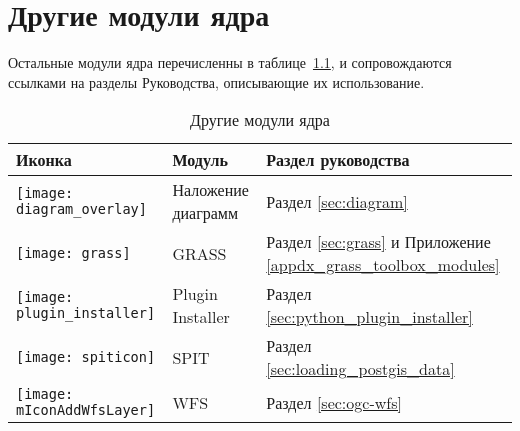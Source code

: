 
\chapter{Другие модули ядра}


Остальные модули ядра перечисленны в таблице~\ref{tab:other_core}, и
сопровождаются ссылками на разделы Руководства, описывающие их использование.

\begin{table}[H]
\centering
 \begin{tabular}{|l|l|p{8cm}|}
\hline \textbf{Иконка} & \textbf{Модуль} & \textbf{Раздел руководства}\\
\hline
\texttt{[image: diagram\_overlay]}
 & Наложение диаграмм \index{модули!диаграмма}& Раздел \ref{sec:diagram}\\
\hline
\texttt{[image: grass]}
 & GRASS \index{модули!инструменты GRASS} & Раздел \ref{sec:grass} и Приложение \ref{appdx_grass_toolbox_modules}\\
 \hline
\texttt{[image: plugin\_installer]}
 & Plugin Installer \index{модули!Plugin Installer} & Раздел \ref{sec:python_plugin_installer}\\
\hline
\texttt{[image: spiticon]}
 & SPIT \index{модули!SPIT}& Раздел \ref{sec:loading_postgis_data} \\
 \hline
\texttt{[image: mIconAddWfsLayer]}
 & WFS & Раздел \ref{sec:ogc-wfs} \\
\hline
\end{tabular}
\caption{Другие модули ядра}\label{tab:other_core}
\end{table}
